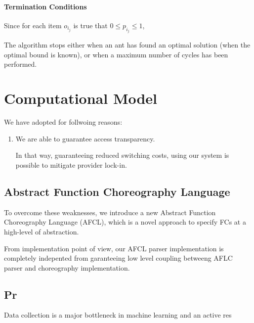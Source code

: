 \documentclass[12pt,a4paper]{report}
\begin{document}
\subsubsection{Termination Conditions}

Since for each item $o_{i_j}$ is true that $0 \leq p_{i_j} \leq 1$, 

The algorithm stops either when an ant has found an optimal solution (when the optimal bound is known), or when a maximum number of cycles has been performed.



\newpage


\chapter{Computational Model}






We have adopted for follwoing reasons:

\begin{enumerate}
	\item We are able to guarantee access transparency. 
	
 
	
	In that way, guaranteeing reduced switching costs, using our system is possible to mitigate provider lock-in.
	
\end{enumerate}

\section{Abstract Function Choreography Language}

To overcome these weaknesses, we introduce a new Abstract
Function Choreography Language (AFCL), which is a novel approach
to specify FCs at a high-level of abstraction. 



From implementation point of view, our AFCL parser implementation is completely indepented from 
garanteeing low level coupling betweeng AFLC parser and choreography implementation.



\section{Pr}

Data collection is a major bottleneck in machine learning and an active res
\end{document}
